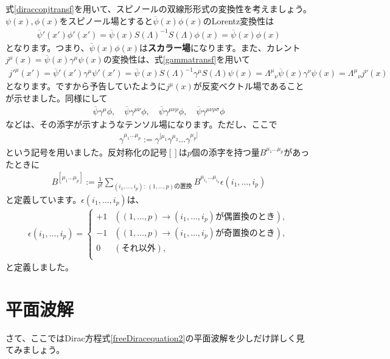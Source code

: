 \documentclass[report,paper=a4, fontsize=12pt, line_length=16cm, number_of_lines=33,dvipdfmx]{jlreq}
\numberwithin{equation}{chapter}
\newcommand{\strong}[1]{{\sffamily \bfseries #1}}
\newcommand{\psib}{\overline{\psi}}
\begin{document}
式\eqref{diracconjtransf}を用いて、スピノールの双線形形式の変換性を考えましょう。$\psi(x),\phi(x)$をスピノール場とすると$\psib(x)\phi(x)$のLorentz変換性は
\begin{align}
  \psib'(x')\phi'(x')
  =\psib(x)S(\Lambda)^{-1}S(\Lambda)\phi(x)
  =\psib(x)\phi(x)
\end{align}
となります。つまり、$\psib(x)\phi(x)$は\strong{スカラー場}になります。また、カレント$j^{\mu}(x)=\psib(x)\gamma^{\mu}\psi(x)$の変換性は、式\eqref{gammatransf}を用いて
\begin{align}
  j'^{\mu}(x')
  =\psib'(x')\gamma^{\mu}\psi'(x')
  =\psib(x)S(\Lambda)^{-1}\gamma^{\mu}S(\Lambda)\psi(x)
  =\Lambda^{\mu}{}_{\nu}\psib(x)\gamma^{\nu}\psi(x)
  =\Lambda^{\mu}{}_{\nu}j^{\nu}(x)
\end{align}
となります。ですから予告していたように$j^{\mu}(x)$が反変ベクトル場であることが示せました。同様にして
\begin{align}
  \psib \gamma^{\mu}\phi,\quad
  \psib \gamma^{\mu\nu}\phi,\quad
  \psib \gamma^{\mu\nu\rho}\phi,\quad
  \psib \gamma^{\mu\nu\rho\sigma}\phi
\end{align}
などは、その添字が示すようなテンソル場になります。ただし、ここで
\begin{align}
  \gamma^{\mu_1\dots \mu_p}:=\gamma^{[\mu_1}\gamma^{\mu_2}\dots \gamma^{\mu_p]}
\end{align}
という記号を用いました。反対称化の記号$[]$は$p$個の添字を持つ量$B^{\mu_1\dots \mu_p}$があったときに
\begin{align}
  B^{[\mu_1\dots \mu_p]}:=\frac{1}{p!}\sum_{(i_1,\dots,i_p):\ (1,\dots, p)\text{の置換}}B^{\mu_{i_1}\dots \mu_{i_p}}\epsilon(i_1,\dots,i_p)\label{antisymmetrization}
\end{align}
と定義しています。$\epsilon(i_1,\dots,i_p)$は、
\begin{align}
  \epsilon(i_1,\dots,i_p)=
  \begin{cases}
    +1 & ((1,\dots,p)\to (i_1,\dots,i_p)\text{が偶置換のとき}),\\
    -1 & ((1,\dots,p)\to (i_1,\dots,i_p)\text{が奇置換のとき}),\\
    0 & (\text{それ以外}),\\
  \end{cases}
\end{align}
と定義しました。

\section{平面波解}
さて、ここではDirac方程式\eqref{freeDiracequation2}の平面波解を少しだけ詳しく見てみましょう。
\end{document}
